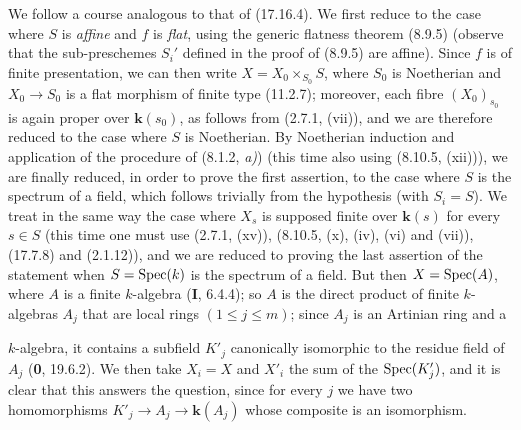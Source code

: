 We follow a course analogous to that of (17.16.4). We first reduce to the case where $S$ is \emph{affine} and $f$ is \emph{flat}, using the generic flatness theorem (8.9.5) (observe that the sub-preschemes $S_i'$ defined in the proof of (8.9.5) are affine). Since $f$ is of finite presentation, we can then write $X=X_0\times_{S_0}S$, where $S_0$ is Noetherian and $X_0\to S_0$ is a flat morphism of finite type (11.2.7); moreover, each fibre $(X_0)_{s_0}$ is again proper over $\boldsymbol{k}(s_0)$, as follows from (2.7.1, (vii)), and we are therefore reduced to the case where $S$ is Noetherian. By Noetherian induction and application of the procedure of (8.1.2, \emph{a)}) (this time also using (8.10.5, (xii))), we are finally reduced, in order to prove the first assertion, to the case where $S$ is the spectrum of a field, which follows trivially from the hypothesis (with $S_i=S$). We treat in the same way the case where $X_s$ is supposed finite over $\boldsymbol{k}(s)$ for every $s\in S$ (this time one must use (2.7.1, (xv)), (8.10.5, (x), (iv), (vi) and (vii)), (17.7.8) and (2.1.12)), and we are reduced to proving the last assertion of the statement when $S=\operatorname{Spec}(k)$ is the spectrum of a field. But then $X=\operatorname{Spec}(A)$, where $A$ is a finite $k$-algebra (\textbf{I}, 6.4.4); so $A$ is the direct product of finite $k$-algebras $A_j$ that are local rings $(1\leq j\leq m)$; since $A_j$ is an Artinian ring and a


$k$-algebra, it contains a subfield $K'_j$ canonically isomorphic to the residue field of $A_j$ (\textbf{0}, 19.6.2). We then take $X_i=X$ and $X'_i$ the sum of the $\operatorname{Spec}(K'_j)$, and it is clear that this answers the question, since for every $j$ we have two homomorphisms $K'_j\to A_j\to\boldsymbol{k}(A_j)$ whose composite is an isomorphism.
